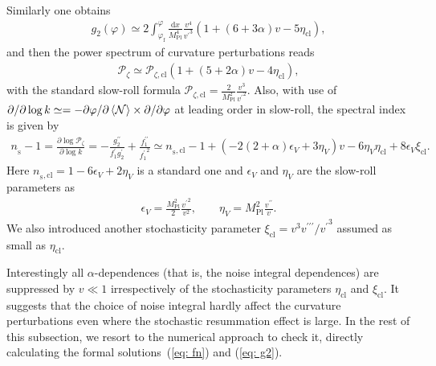 \documentclass[aps, prd
, preprint
, nofootinbib 
, superscriptaddress
, longbibliography
]{revtex4-1}
\newcommand{\pdif}[2]{\frac{\partial #1}{\partial #2}}
\newcommand{\dd}{\mathrm{d}}
\newcommand{\Mpl}{M_\text{Pl}}
\newcommand{\ns}{n_{{}_\mathrm{S}}}
\newcommand{\cl}{\text{cl}}
\newcommand{\uf}{\text{f}}
\newcommand{\calN}{\mathcal{N}}
\newcommand{\calP}{\mathcal{P}}
\newcommand{\uS}{\text{S}}
\newcommand{\bae}[1]{\begin{align} #1 \end{align}}
\begin{document}
Similarly one obtains
\bae{\label{eq: g2 saddle}
	g_2(\varphi)\simeq2\int^\varphi_{\varphi_\uf}\frac{\dd x}{\Mpl^4}\frac{v^4}{{v^\prime}^3}\left(1+(6+3\alpha)v-5\eta_\cl\right),
}
and then the power spectrum of curvature perturbations reads
\bae{\label{eq: calP saddle}
	\calP_\zeta\simeq\calP_{\zeta,\cl}\left(1+(5+2\alpha)v-4\eta_\cl\right),
}
with the standard slow-roll formula $\calP_{\zeta,\cl}=\frac{2}{\Mpl^2}\frac{v^3}{{v^\prime}^2}$.
Also, with use of $\partial/\partial\log k\simeq=-\partial\varphi/\partial\braket{\calN}\times\partial/\partial\varphi$ at leading order in slow-roll, the spectral index is given by
\bae{\label{eq: ns saddle}
	\ns-1=\pdif{\log\calP_\zeta}{\log k}=-\frac{g_2^{\prime\prime}}{f_1^\prime g_2^\prime}+\frac{f_1^{\prime\prime}}{{f_1^\prime}^2}\simeq n_{{}_\text{S},\cl}-1+\left(-2(2+\alpha)\epsilon_V+3\eta_V\right)v-6\eta_V\eta_\cl+8\epsilon_V\xi_\cl.
}
Here $n_{{}_\uS,\cl}=1-6\epsilon_V+2\eta_V$ is a standard one and $\epsilon_V$ and $\eta_V$ are the slow-roll parameters as
\bae{
	\epsilon_V=\frac{\Mpl^2}{2}\frac{{v^\prime}^2}{v^2}, \qquad \eta_V=\Mpl^2\frac{v^{\prime\prime}}{v}.
}
We also introduced another stochasticity parameter $\xi_\cl=v^3v^{\prime\prime\prime}/{v^\prime}^3$ assumed as small as $\eta_\cl$.

Interestingly all $\alpha$-dependences (that is, the noise integral dependences) are suppressed by $v\ll1$ irrespectively of the stochasticity parameters $\eta_\cl$ and $\xi_\cl$.
It suggests that the choice of noise integral hardly affect the curvature perturbations even where the stochastic resummation effect is large. 
In the rest of this subsection, we resort to the numerical approach to check it, directly calculating the formal solutions~(\ref{eq: fn}) and (\ref{eq: g2}).
\end{document}
